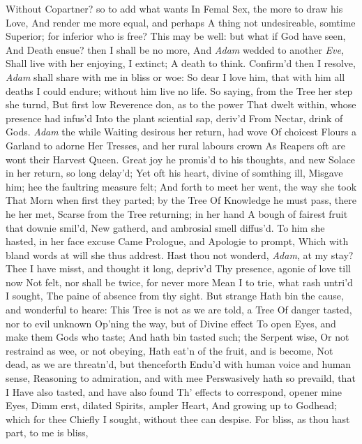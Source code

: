 \documentclass[11pt]{book}
\newcounter {first}
\begin{document}
Without Copartner? so to add what wants 
In Femal Sex, the more to draw his Love, 
And render me more equal, and perhaps 
A thing not undesireable, somtime 
Superior; for inferior who is free? 
This may be well: but what if God have seen, 
And Death ensue? then I shall be no more, 
And \textit{Adam} wedded to another \textit{Eve}, 
Shall live with her enjoying, I extinct; 
A death to think.  Confirm'd then I resolve, 
\textit{Adam} shall share with me in bliss or woe: 
So dear I love him, that with him all deaths 
I could endure; without him live no life. 
\quad So saying, from the Tree her step she turnd, 
But first low Reverence don, as to the power 
That dwelt within, whose presence had infus'd 
Into the plant sciential sap, deriv'd 
From Nectar, drink of Gods.  \textit{Adam} the while 
Waiting desirous her return, had wove 
Of choicest Flours a Garland to adorne 
Her Tresses, and her rural labours crown 
As Reapers oft are wont their Harvest Queen. 
Great joy he promis'd to his thoughts, and new 
Solace in her return, so long delay'd; 
Yet oft his heart, divine of somthing ill, 
Misgave him; hee the faultring measure felt; 
And forth to meet her went, the way she took 
That Morn when first they parted; by the Tree 
Of Knowledge he must pass, there he her met, 
Scarse from the Tree returning; in her hand 
A bough of fairest fruit that downie smil'd, 
New gatherd, and ambrosial smell diffus'd. 
To him she hasted, in her face excuse 
Came Prologue, and Apologie to prompt, 
Which with bland words at will she thus addrest. 
\quad Hast thou not wonderd, \textit{Adam}, at my stay? 
Thee I have misst, and thought it long, depriv'd 
Thy presence, agonie of love till now 
Not felt, nor shall be twice, for never more 
Mean I to trie, what rash untri'd I sought, 
The paine of absence from thy sight.  But strange 
Hath bin the cause, and wonderful to heare: 
This Tree is not as we are told, a Tree 
Of danger tasted, nor to evil unknown 
Op'ning the way, but of Divine effect 
To open Eyes, and make them Gods who taste; 
And hath bin tasted such; the Serpent wise, 
Or not restraind as wee, or not obeying, 
Hath eat'n of the fruit, and is become, 
Not dead, as we are threatn'd, but thenceforth 
Endu'd with human voice and human sense, 
Reasoning to admiration, and with mee 
Perswasively hath so prevaild, that I 
Have also tasted, and have also found 
Th' effects to correspond, opener mine Eyes, 
Dimm erst, dilated Spirits, ampler Heart, 
And growing up to Godhead; which for thee 
Chiefly I sought, without thee can despise. 
For bliss, as thou hast part, to me is bliss, 
\end{document}
